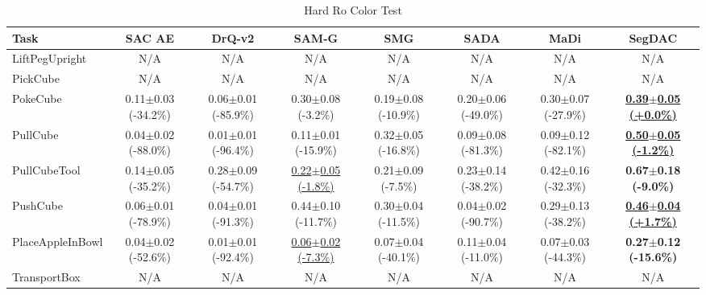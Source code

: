 \begin{table}[htbp]
\centering
\scriptsize
\caption{Hard Ro Color Test}
\label{tab:appendix_rocolortest_hard}
\begin{adjustbox}{max width=\textwidth}
\begin{tabular}{l*{7}{c}}
\toprule
\textbf{Task} & \textbf{SAC AE} & \textbf{DrQ-v2} & \textbf{SAM-G} & \textbf{SMG} & \textbf{SADA} & \textbf{MaDi} & \textbf{SegDAC} \\
\midrule
LiftPegUpright & N/A & N/A & N/A & N/A & N/A & N/A & N/A \\
PickCube & N/A & N/A & N/A & N/A & N/A & N/A & N/A \\
PokeCube & 0.11$\pm$0.03 \scriptsize{(-34.2\%)} & 0.06$\pm$0.01 \scriptsize{(-85.9\%)} & 0.30$\pm$0.08 \scriptsize{(-3.2\%)} & 0.19$\pm$0.08 \scriptsize{(-10.9\%)} & 0.20$\pm$0.06 \scriptsize{(-49.0\%)} & 0.30$\pm$0.07 \scriptsize{(-27.9\%)} & \textbf{\underline{0.39$\pm$0.05 \scriptsize{(+0.0\%)}}} \\
PullCube & 0.04$\pm$0.02 \scriptsize{(-88.0\%)} & 0.01$\pm$0.01 \scriptsize{(-96.4\%)} & 0.11$\pm$0.01 \scriptsize{(-15.9\%)} & 0.32$\pm$0.05 \scriptsize{(-16.8\%)} & 0.09$\pm$0.08 \scriptsize{(-81.3\%)} & 0.09$\pm$0.12 \scriptsize{(-82.1\%)} & \textbf{\underline{0.50$\pm$0.05 \scriptsize{(-1.2\%)}}} \\
PullCubeTool & 0.14$\pm$0.05 \scriptsize{(-35.2\%)} & 0.28$\pm$0.09 \scriptsize{(-54.7\%)} & \underline{0.22$\pm$0.05 \scriptsize{(-1.8\%)}} & 0.21$\pm$0.09 \scriptsize{(-7.5\%)} & 0.23$\pm$0.14 \scriptsize{(-38.2\%)} & 0.42$\pm$0.16 \scriptsize{(-32.3\%)} & \textbf{0.67$\pm$0.18 \scriptsize{(-9.0\%)}} \\
PushCube & 0.06$\pm$0.01 \scriptsize{(-78.9\%)} & 0.04$\pm$0.01 \scriptsize{(-91.3\%)} & 0.44$\pm$0.10 \scriptsize{(-11.7\%)} & 0.30$\pm$0.04 \scriptsize{(-11.5\%)} & 0.04$\pm$0.02 \scriptsize{(-90.7\%)} & 0.29$\pm$0.13 \scriptsize{(-38.2\%)} & \textbf{\underline{0.46$\pm$0.04 \scriptsize{(+1.7\%)}}} \\
PlaceAppleInBowl & 0.04$\pm$0.02 \scriptsize{(-52.6\%)} & 0.01$\pm$0.01 \scriptsize{(-92.4\%)} & \underline{0.06$\pm$0.02 \scriptsize{(-7.3\%)}} & 0.07$\pm$0.04 \scriptsize{(-40.1\%)} & 0.11$\pm$0.04 \scriptsize{(-11.0\%)} & 0.07$\pm$0.03 \scriptsize{(-44.3\%)} & \textbf{0.27$\pm$0.12 \scriptsize{(-15.6\%)}} \\
TransportBox & N/A & N/A & N/A & N/A & N/A & N/A & N/A \\
\bottomrule
\end{tabular}
\end{adjustbox}
\end{table}

